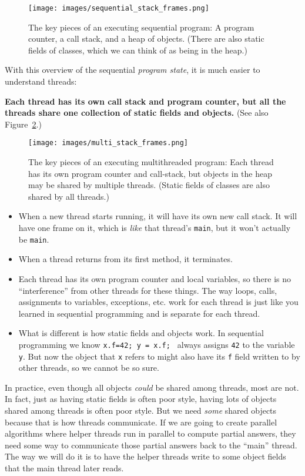 \documentclass[10pt]{article}
\begin{document}
\begin{figure}
\begin{center}
\texttt{[image: images/sequential\_stack\_frames.png]}
\end{center}
\caption{The key pieces of an executing sequential program: A program
  counter, a call stack, and a heap of objects.  (There are also
  static fields of classes, which we can think of as being in the heap.)}
\label{fig:sequential_state}
\end{figure}

With this overview of the sequential \emph{program state}, it is much
easier to understand threads: 

\medskip
\noindent\textbf{Each thread has its own call
  stack and program counter, but all the threads share one collection
  of static fields and objects.} (See also Figure~\ref{fig:multi_state}.)
\medskip

\begin{figure}
\begin{center}
\texttt{[image: images/multi\_stack\_frames.png]}
\end{center}
\caption{The key pieces of an executing multithreaded program: Each
  thread has its own program counter and call-stack, but objects in
  the heap may be shared by multiple threads.  (Static fields of
  classes are also shared by all threads.)}  
\label{fig:multi_state}
\end{figure}

\begin{itemize}
\item When a new thread starts running, it will have its own new call
  stack.  It will have one frame on it, which is \emph{like} that thread's
  {\tt main}, but it won't actually be {\tt main}.
\item When a thread returns from its first method, it terminates.
\item Each thread has its own program counter and local variables, so
  there is no ``interference'' from other threads for these things.
  The way loops, calls, assignments to variables, exceptions,
  etc. work for each thread is just like you learned in sequential
  programming and is separate for each thread.
\item What is different is how static fields and objects work.  In
  sequential programming we know {\tt x.f=42; y = x.f; } always
  assigns {\tt 42} to the variable {\tt y}.  But now the object
  that {\tt x} refers to might also have its {\tt f} field written to
  by other threads, so we cannot be so sure.
\end{itemize}
In practice, even though all objects \emph{could} be shared among
threads, most are not.  In fact, just as having static fields
is often poor style, having lots of objects shared among threads is
often poor style.  But we need \emph{some} shared objects
because that is how threads communicate.  If we are going to create
parallel algorithms where helper threads run in parallel to compute
partial answers, they need some way to communicate those partial
answers back to the ``main'' thread.  The way we will do it is to
have the helper threads write to some object fields that the main
thread later reads.
\end{document}
